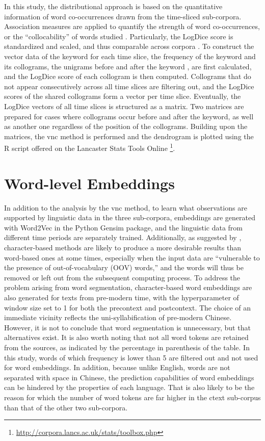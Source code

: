 In this study, the distributional approach is based on the quantitative information of word co-occurrences drawn from the time-sliced sub-corpora. Association measures are applied to quantify the strength of word co-occurrences, or the ``collocability'' of words studied \parencite{gablasova2017collocations}. Particularly, the LogDice score is standardized and scaled, and thus comparable across corpora \parencite{rychly2008lexicographer,gablasova2017collocations}. To construct the vector data of the keyword \jia for each time slice, the frequency of the keyword and its collograms, the unigrams before and after the keyword \parencite{gablasova2017collocations}, are first calculated, and the LogDice score of each collogram is then computed. Collograms that do not appear consecutively across all time slices are filtering out, and the LogDice scores of the shared collograms form a vector per time slice. Eventually, the LogDice vectors of all time slices is structured as a matrix. Two matrices are prepared for cases where collograms occur before and after the keyword, as well as another one regardless of the position of the collograms. Building upon the matrices, the \gls{vnc} method is performed and the dendrogram is plotted using the R script offered on the Lancaster Stats Tools Online \parencite{brezina2018statistics} \footnote{\url{http://corpora.lancs.ac.uk/stats/toolbox.php}}.

\section{Word-level Embeddings}
In addition to the analysis by the \gls{vnc} method, to learn what observations are supported by linguistic data in the three sub-corpora, embeddings are generated with Word2Vec in the Python Gensim package, and the linguistic data from different time periods are separately trained. Additionally, as suggested by \textcite{li2019word}, character-based methods are likely to produce a more desirable results than word-based ones at some times, especially when the input data are ``vulnerable to the presence of out-of-vocabulary (OOV) words,'' and the words will thus be removed or left out from the subsequent computing process. To address the problem arising from word segmentation, character-based word embeddings are also generated for texts from pre-modern time, with the hyperparameter of window size set to 1 for both the precontext and postcontext. The choice of an immediate vicinity reflects the uni-syllabification of pre-modern Chinese. However, it is not to conclude that word segmentation is unnecessary, but that alternatives exist.  It is also worth noting that not all word tokens are retained from the sources, as indicated by the percentage in parenthesis of the table. In this study, words of which frequency is lower than 5 are filtered out and not used for word embeddings. In addition, because unlike English, words are not separated with space in Chinese, the prediction capabilities of word embeddings can be hindered by the properties of each language. That is also likely to be the reason for which the number of word tokens are far higher in the \gls{ctext} sub-corpus than that of the other two sub-corpora.

